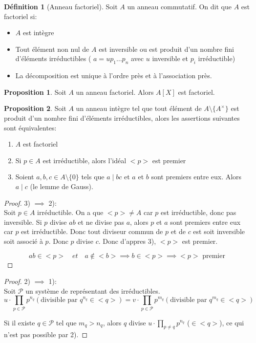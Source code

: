 \documentclass{article}
\theoremstyle{definition}
\newtheorem{definition}{Définition}
\theoremstyle{definition}
\newtheorem{prop}{Proposition}
\theoremstyle{definition}
\theoremstyle{plain}
\theoremstyle{theorem}
\begin{document}
\begin{definition}[Anneau factoriel]
	Soit $A$ un anneau commutatif. On dit que $A$ est factoriel si:
	\begin{itemize}
		\item $A$ est intègre
		\item Tout élément non nul de $A$ est inversible ou est produit d'un nombre fini d'éléments irréductibles ( $a = u p_1 \dots p_n$ avec $u$ inversible et $p_i$ irréductible)
		\item La décomposition est unique à l'ordre près et à l'association près.
	\end{itemize}
\end{definition}

\begin{prop}
	Soit $A$ un anneau factoriel. Alors $A[X]$ est factoriel.
\end{prop}


\begin{prop}
	Soit $A$ un anneau intègre tel que tout élément de $A\setminus\{A^{\times}\}$ est produit d'un nombre fini d'éléments irréductibles, alors les assertions suivantes sont équivalentes:
	\begin{enumerate}
		\item $A$ est factoriel
		\item Si $p \in A$ est irréductible, alors l'idéal $<p>$ est premier
		\item Soient $a,b,c \in A\setminus\{0\}$ tels que $a \mid bc$ et $a$ et $b$ sont premiers entre eux. Alors $a \mid c$ (le lemme de Gauss).
	\end{enumerate}
\end{prop}

\begin{proof}

	3) $\implies$ 2):\\
	Soit $p \in A$ irréductible. On a que $<p> \neq A$ car $p$ est irréductible, donc pas inversible.
	Si $p$ divise $ab$ et ne divise pas $a$, alors $p$ et $a$ sont premiers entre eux car $p$ est irréductible.
	Donc tout diviseur commun de $p$ et de $c$ est soit inversible soit associé à $p$. Donc $p$ divise $c$.
	Donc d'appres 3), $<p>$ est premier.

	\[ ab \in <p>\quad  et \quad a \notin <b> \implies b \in <p> \implies <p> \text{ premier} \]

\end{proof}

\begin{proof}

    2) $\implies$ 1):\\
    Soit $\mathcal{P}$ un système de représentant des irréductibles. 
	\begin{equation*}
        u \cdot \prod_{p \in \mathcal{P}} p^{n_q} (\text{divisible par } q^{n_q} \in <q> ) = v \cdot \prod_{p \in \mathcal{P}} p^{m_q} (\text{divisible par } q^{m_q} \in <q>)
	\end{equation*}
	\noindent

    Si il existe $q \in \mathcal{P}$ tel que $m_q > n_q$, alors $q$ divise $u \cdot \prod_{p \ne q} p^{n_q}$ ($\in <q>$), ce qui n'est pas possible par 2).

\end{proof}
\end{document}
